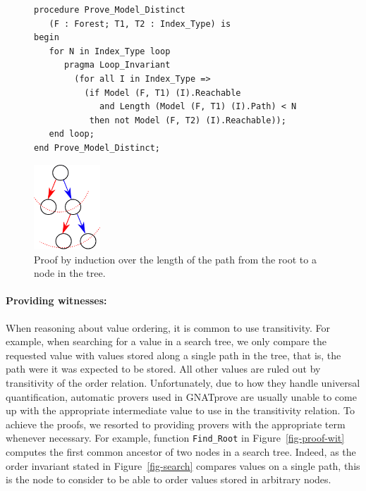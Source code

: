 \documentclass{llncs}
\newcommand{\gnatprove}{GNATprove\xspace}
\begin{document}
\begin{figure}
\begin{minipage}[c]{.75\linewidth}
\begin{small}
\begin{lstlisting}
procedure Prove_Model_Distinct
   (F : Forest; T1, T2 : Index_Type) is
begin
   for N in Index_Type loop
      pragma Loop_Invariant
        (for all I in Index_Type =>
          (if Model (F, T1) (I).Reachable
             and Length (Model (F, T1) (I).Path) < N
           then not Model (F, T2) (I).Reachable));
   end loop;
end Prove_Model_Distinct;
\end{lstlisting}
\end{small}
\end{minipage}\hfill
\begin{minipage}[c]{.22\linewidth}
\begin{center}
\includegraphics[width=25mm]{induction.pdf}
\end{center}
\end{minipage}
\caption{\label{fig-proof-ind} Proof by induction over the length of the path from the root to a node in the tree.}
\end{figure}

\paragraph{Providing witnesses:}
When reasoning about value ordering, it is common to use transitivity. For example, when searching for
a value in a search tree, we only compare the requested value with values stored along a single path in
the tree, that is, the path were it was expected to be stored. All other values are ruled out by
transitivity of the order relation. Unfortunately, due to how they handle universal quantification,
automatic provers used in \gnatprove are usually unable to come up with the appropriate
intermediate value to use in the transitivity relation. To achieve the proofs, we resorted to providing
provers with the appropriate term whenever necessary. For example, function \texttt{Find\_Root} in
Figure~\ref{fig-proof-wit} computes the first common ancestor of two nodes in a search tree. Indeed, as
the order invariant stated in Figure~\ref{fig-search} compares values on a single path, this
is the node to consider to be able to order values stored in arbitrary nodes.
\end{document}
